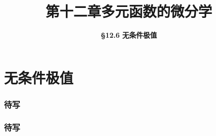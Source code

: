 \everymath{\displaystyle}



\title[第十二章\\
多元微分学]{\texorpdfstring{\LARGE \bfseries 第十二章\quad 多元函数的微分学}{第十二章 多元函数的微分学}} %
\author[\smaller \S 12.6\\
无条件极值] %
{\Large \bfseries \S 12.6 无条件极值}
\date{}





\begin{frame}

\titlepage %

\end{frame}



\section{无条件极值}


\begin{frame}
\frametitle{待写}

\end{frame}


\begin{frame}
\frametitle{待写}

\end{frame}


